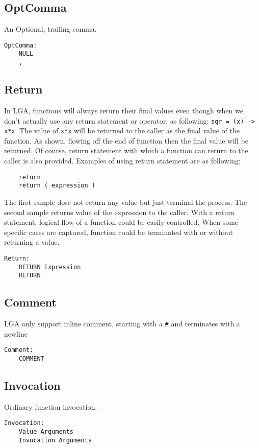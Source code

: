 \documentclass[10pt]{report}
\begin{document}
\subsection{OptComma}
An Optional, trailing comma.
\begin{verbatim}
OptComma:
    NULL
    ,
\end{verbatim}

\subsection{Return}

In LGA, functions will always return their final values even though when we don’t actually use any return statement or operator, as following: \texttt{sqr = (x) -> x*x}. The value of \texttt{x*x} will be returned to the caller as the final value of the function. As shown, flowing off the end of function then the final value will be returned.
Of course, return statement with which a function can return to the caller is also provided. Examples of using return statement are as following:
\begin{verbatim}
	return
	return ( expression )
\end{verbatim}

The first sample dose not return any value but just terminal the process. The second sample returns value of the expression to the caller. With a return statement, logical flow of a function could be easily controlled. When some specific cases are captured, function could be terminated with or without returning a value.

\begin{verbatim}
Return:
    RETURN Expression
    RETURN
\end{verbatim}


\subsection{Comment}
LGA only support inline comment, starting with a \texttt{\#} and terminates with a newline
\begin{verbatim}
Comment:
    COMMENT
\end{verbatim}

\subsection{Invocation}
Ordinary function invocation.

\begin{verbatim}
Invocation:
    Value Arguments
    Invocation Arguments
\end{verbatim}
\end{document}
